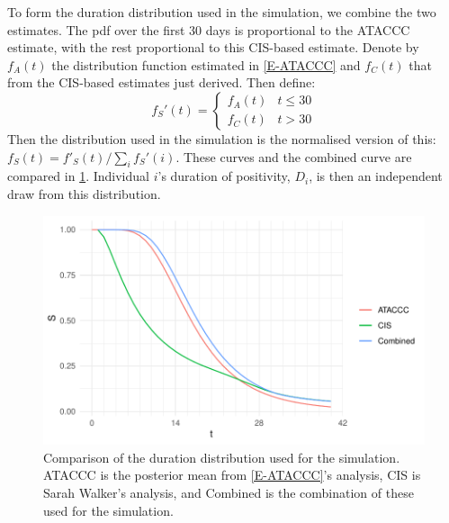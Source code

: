 \documentclass[thesis.tex]{subfiles}
\begin{document}

To form the duration distribution used in the simulation, we combine the two estimates.
The pdf over the first 30 days is proportional to the ATACCC estimate, with the rest proportional to this CIS-based estimate.
Denote by $f_A(t)$ the distribution function estimated in \cref{E-ATACCC} and $f_C(t)$ that from the CIS-based estimates just derived.
Then define:
$$
f_S'(t) = \begin{cases}
	f_A(t) &t \leq 30 \\
	f_C(t) &t > 30
\end{cases}
$$
Then the distribution used in the simulation is the normalised version of this: $f_S(t) = f'_S(t)/\sum_i f_S'(i)$.
These curves and the combined curve are compared in \cref{perf-test:fig:duration-dist}.
Individual $i$'s duration of positivity, $D_i$, is then an independent draw from this distribution.
\begin{figure}
  \centering \includegraphics{cis-perfect-testing/input-duration-dists}
  \caption[Comparison of duration distributions]{Comparison of the duration distribution used for the simulation. ATACCC is the posterior mean from \cref{E-ATACCC}'s analysis, CIS is Sarah Walker's analysis, and Combined is the combination of these used for the simulation. \label{perf-test:fig:duration-dist}}
\end{figure}
\end{document}
